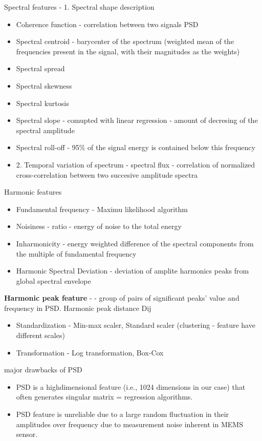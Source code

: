 Spectral features \cite{peeters_large_2004} - 1. Spectral shape description
\begin{itemize}
\item Coherence function - correlation between two signals PSD
\item  Spectral centroid - barycenter of the spectrum (weighted mean of the frequencies present in the signal, with their magnitudes as the weights)
\item Spectral spread
\item Spectral skewness
\item Spectral kurtosis
\item Spectral slope - comupted with linear regression - amount of decresing of the spectral amplitude
\item Spectral roll-off - 95\% of the signal energy is contained below this frequency
\item 2. Temporal variation of spectrum - spectral flux - correlation of normalized cross-correlation between two succesive amplitude spectra
\end{itemize}

Harmonic features
\begin{itemize}
\item Fundamental frequency  - Maximu likelihood algorithm
\item Noisiness - ratio - energy of noise to the total energy
\item Inharmonicity - energy weighted difference of the spectral components from the multiple of fundamental frequency
\item Harmonic Spectral Deviation - deviation of amplite harmonics peaks from global spectral envelope
\end{itemize}

\textbf{Harmonic peak feature} - \cite{jung_vibration_2017}- group of pairs of significant peaks’ value and frequency in PSD. Harmonic peak distance Dij

\begin{itemize}
\item Standardization - Min-max scaler, Standard scaler (clustering - feature have different scales)
\item Transformation - Log transformation, Box-Cox
\end{itemize}

major drawbacks of PSD
\begin{itemize}
	\item PSD is a highdimensional feature (i.e., 1024 dimensions in our case) that often generates singular matrix = regression algorithms.
	\item PSD feature is unreliable due to a large random fluctuation in their amplitudes over frequency due to measurement noise inherent in MEMS sensor.
\end{itemize}

